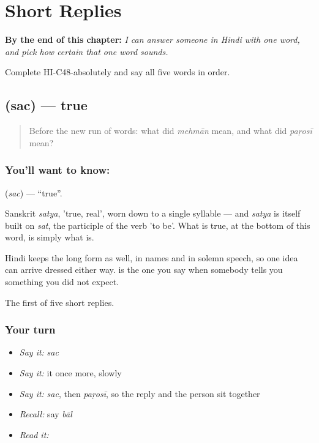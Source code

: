 
\chapter{Short Replies}
\label{ch:hi-replies}

\begin{chapteropening}
\textbf{By the end of this chapter:} \emph{I can answer someone in Hindi with one word, and pick how certain that one word sounds.}

Complete HI-C48-absolutely and say all five words in order.
\end{chapteropening}

\section[\texorpdfstring{\hi{सच} (sac)}{सच (sac)}]{ (sac) — true}

\label{lesson:HI-C48-true}



\begin{quote}
Before the new run of words: what did \emph{mehmān} mean, and what did \emph{paṛosī} mean?
\end{quote}

\subsection*{You'll want to know: }
\textbf{} (\emph{sac}) — \textquotedblleft{}true\textquotedblright{}.

Sanskrit \emph{satya}, 'true, real', worn down to a single syllable — and \emph{satya} is itself built on \emph{sat}, the participle of the verb 'to be'. What is true, at the bottom of this word, is simply what is.

Hindi keeps the long form as well, in names and in solemn speech, so one idea can arrive dressed either way.  is the one you say when somebody tells you something you did not expect.

\begin{grammarlens}[title={What you've built}]
The first of five short replies.
\end{grammarlens}

\subsection*{Your turn}
\begin{itemize}
\raggedright
  \item \emph{Say it:} \emph{sac}
  \item \emph{Say it:} it once more, slowly
  \item \emph{Say it:} \emph{sac}, then \emph{paṛosī}, so the reply and the person sit together
  \item \emph{Recall:} say \emph{bāl}
  \item \emph{Read it:} \textbf{}
\end{itemize}

